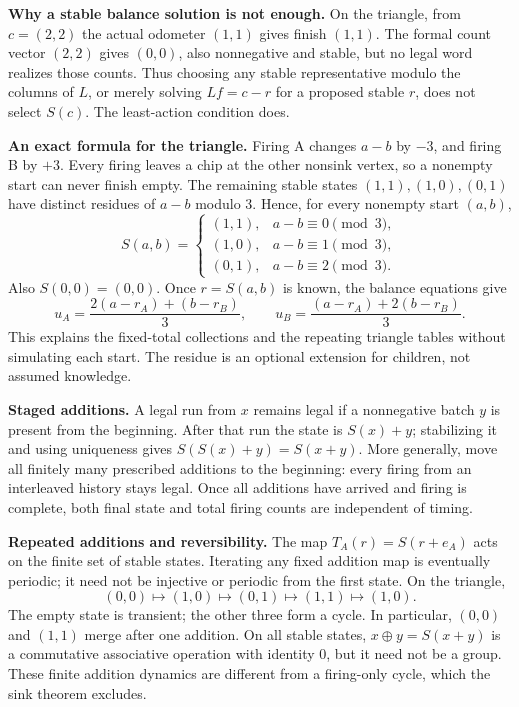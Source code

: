 \documentclass[11pt,letterpaper]{article}
\begin{document}
\textbf{Why a stable balance solution is not enough.} On the triangle, from $c=(2,2)$ the actual odometer $(1,1)$ gives finish $(1,1)$. The formal count vector $(2,2)$ gives $(0,0)$, also nonnegative and stable, but no legal word realizes those counts. Thus choosing any stable representative modulo the columns of $L$, or merely solving $Lf=c-r$ for a proposed stable $r$, does not select $S(c)$. The least-action condition does.

\textbf{An exact formula for the triangle.} Firing A changes $a-b$ by $-3$, and firing B by $+3$. Every firing leaves a chip at the other nonsink vertex, so a nonempty start can never finish empty. The remaining stable states $(1,1),(1,0),(0,1)$ have distinct residues of $a-b$ modulo 3. Hence, for every nonempty start $(a,b)$,
\[
S(a,b)=
\begin{cases}
(1,1),&a-b\equiv0\pmod3,\\
(1,0),&a-b\equiv1\pmod3,\\
(0,1),&a-b\equiv2\pmod3.
\end{cases}
\]
Also $S(0,0)=(0,0)$. Once $r=S(a,b)$ is known, the balance equations give
\[
u_A=\frac{2(a-r_A)+(b-r_B)}3,\qquad
u_B=\frac{(a-r_A)+2(b-r_B)}3.
\]
This explains the fixed-total collections and the repeating triangle tables without simulating each start. The residue is an optional extension for children, not assumed knowledge.

\textbf{Staged additions.} A legal run from $x$ remains legal if a nonnegative batch $y$ is present from the beginning. After that run the state is $S(x)+y$; stabilizing it and using uniqueness gives $S(S(x)+y)=S(x+y)$. More generally, move all finitely many prescribed additions to the beginning: every firing from an interleaved history stays legal. Once all additions have arrived and firing is complete, both final state and total firing counts are independent of timing.

\textbf{Repeated additions and reversibility.} The map $T_A(r)=S(r+e_A)$ acts on the finite set of stable states. Iterating any fixed addition map is eventually periodic; it need not be injective or periodic from the first state. On the triangle,
\[
(0,0)\longmapsto(1,0)\longmapsto(0,1)\longmapsto(1,1)\longmapsto(1,0).
\]
The empty state is transient; the other three form a cycle. In particular, $(0,0)$ and $(1,1)$ merge after one addition. On all stable states, $x\oplus y=S(x+y)$ is a commutative associative operation with identity $0$, but it need not be a group. These finite addition dynamics are different from a firing-only cycle, which the sink theorem excludes.
\end{document}
